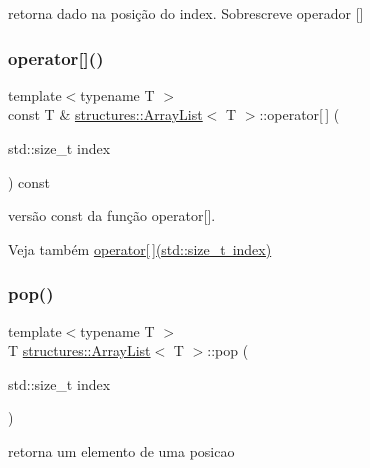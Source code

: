 retorna dado na posição do index. Sobrescreve operador \mbox{[}\mbox{]} 

\mbox{\label{classstructures_1_1ArrayList_a14f95d5eba667fdbb3d826f71a16fc5c}} 
\subsubsection{\texorpdfstring{operator[]()}{operator[]()}\hspace{0.1cm}{\footnotesize\ttfamily [2/2]}}
{\footnotesize\ttfamily template$<$typename T $>$ \\
const T \& \mbox{\hyperlink{classstructures_1_1ArrayList}{structures\+::\+Array\+List}}$<$ T $>$\+::operator\mbox{[}$\,$\mbox{]} (\begin{DoxyParamCaption}\item[{std\+::size\+\_\+t}]{index }\end{DoxyParamCaption}) const}

versão const da função operator\mbox{[}\mbox{]}. \begin{DoxySeeAlso}{Veja também}
\mbox{\hyperlink{classstructures_1_1ArrayList_a1ff71f9c1ebce9408c52115651ab4e77}{operator\mbox{[}$\,$\mbox{]}(std\+::size\+\_\+t index)}} 
\end{DoxySeeAlso}
\mbox{\label{classstructures_1_1ArrayList_ab168d19e50911171715ed5ceccde79b1}} 
\subsubsection{\texorpdfstring{pop()}{pop()}}
{\footnotesize\ttfamily template$<$typename T $>$ \\
T \mbox{\hyperlink{classstructures_1_1ArrayList}{structures\+::\+Array\+List}}$<$ T $>$\+::pop (\begin{DoxyParamCaption}\item[{std\+::size\+\_\+t}]{index }\end{DoxyParamCaption})}



retorna um elemento de uma posicao 

